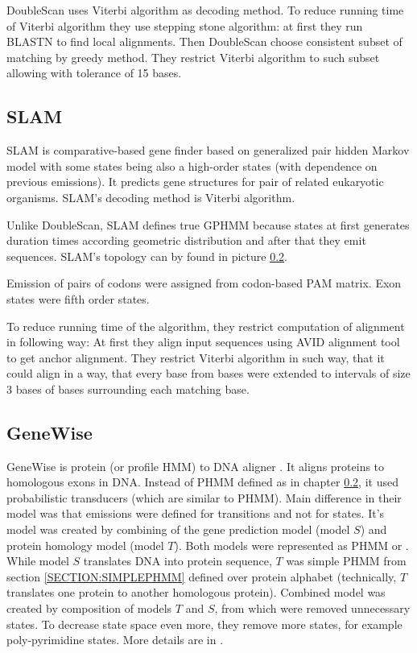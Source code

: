 DoubleScan uses Viterbi algorithm as decoding method.  To reduce running time of
Viterbi algorithm they use stepping stone algorithm: at first they run BLASTN to
find local alignments. Then DoubleScan choose consistent subset of matching by
greedy method. They restrict Viterbi algorithm to such subset allowing with
tolerance of 15 bases.

\subsection{SLAM}

SLAM is comparative-based gene finder \cite{SLAM2003} based on generalized pair
hidden Markov model \cite{Alexanderson2004} with some states being also a
high-order states (with dependence on previous emissions).  It predicts gene
structures for pair of related eukaryotic organisms. SLAM's decoding method is
Viterbi algorithm. 

Unlike DoubleScan, SLAM defines true GPHMM because states at first generates
duration times according geometric distribution and after that they emit
sequences. SLAM's topology can by found in picture \ref{}. 

Emission of pairs of codons were assigned from codon-based PAM matrix. Exon
states were fifth order states.

To reduce running time of the algorithm, they restrict computation of alignment
in following way: At first they  align input sequences using AVID alignment
tool\cite{} to get anchor alignment. They restrict Viterbi algorithm in such
way, that it could align  in a way, that every base from  bases were extended to
intervals of size $3$ bases of bases surrounding each matching base.


\subsection{GeneWise}

GeneWise is protein (or profile HMM) to DNA aligner \cite{Birney2004}. It aligns
proteins to homologous exons in DNA. Instead of PHMM defined as in chapter
\ref{}, it used probabilistic transducers (which are similar to PHMM). Main
difference in their model was that emissions were defined for transitions and
not for states.  It's model was created by combining of the gene prediction
model (model $S$) and protein homology model (model $T$). Both models were
represented as PHMM or . While model $S$ translates DNA into protein sequence, $T$ was simple PHMM
from section \ref{SECTION:SIMPLEPHMM} defined over protein alphabet
(technically, $T$ translates one protein to another homologous protein).
Combined model was created by composition of models $T$ and $S$, from which were
removed unnecessary states. To decrease state space even more, they remove more
states, for example poly-pyrimidine states. More details are in
\cite{Birney2004}.

